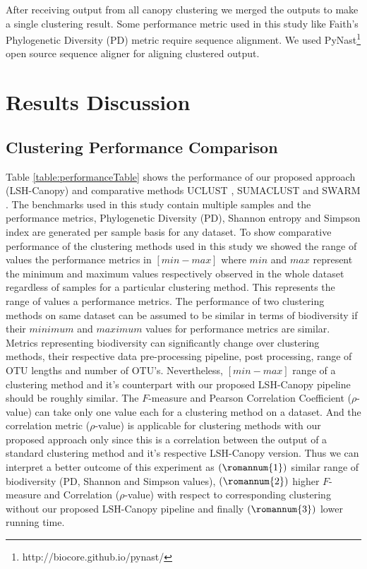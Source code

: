 \documentclass[10pt, conference, compsocconf]{IEEEtran}
\begin{document}
After receiving output from all canopy clustering we merged the outputs to make a single clustering result. Some performance metric used in this study like Faith’s Phylogenetic Diversity (PD) metric require sequence alignment. We used PyNast\footnote{http://biocore.github.io/pynast/} \cite{MARPynast} open source sequence aligner for aligning clustered output.    


\section{Results Discussion} 
\label{sec:results}

\subsection{\textbf{Clustering Performance Comparison}}


Table \ref{table:performanceTable} shows the performance of our proposed approach (LSH-Canopy)
and 
comparative methods UCLUST \cite{MARuclust}, 
SUMACLUST \cite{MARSumaclust} and SWARM \cite{MARSwarm}. 
%
The benchmarks
used in this study contain multiple samples and the  performance 
metrics,   
Phylogenetic Diversity (PD), Shannon entropy and 
Simpson index are generated per sample basis for any dataset. To show comparative performance 
of the clustering methods used in this study we showed the range of values the 
performance metrics in $\left[min-max\right]$ where
$min$ and $max$ represent the minimum and maximum values respectively observed in the 
whole dataset regardless of samples for a particular
clustering method. 
%
This represents the range of values a performance metrics. The  performance of two 
clustering methods on same dataset can be assumed  to be 
similar in terms of biodiversity if their $minimum$ and $maximum$ values for performance metrics 
are similar. Metrics representing biodiversity can significantly change over clustering methods, their respective 
data pre-processing pipeline, post processing, range of OTU lengths and  number of OTU's. Nevertheless, $\left[min-max\right]$ 
range of a clustering method and it's counterpart with our 
proposed LSH-Canopy pipeline should be roughly similar. The 
$F$-measure and Pearson Correlation Coefficient ($\rho$-value) can take only one 
value each for a clustering method on a dataset. And the correlation metric ($\rho$-value) is applicable for 
clustering methods with our proposed approach only since this is a correlation between the 
output of a standard clustering method and it's respective LSH-Canopy 
version. Thus we can interpret a better outcome of this 
experiment as $(\romannum{1})$  similar range of biodiversity 
(PD, Shannon and Simpson values), $(\romannum{2})$ higher $F$-measure and 
Correlation ($\rho$-value) with respect to corresponding clustering 
without our proposed LSH-Canopy pipeline and finally $(\romannum{3})$ lower running time. 
\end{document}
